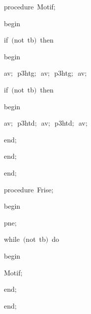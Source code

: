 {\pagebreak[3] 
\vspace{\neglskip}\mbox{\blc  \blk\idt  \mcl procedure\idt \ Motif$;$}\par 
\vspace{\neglskip}\mbox{\blc  \blk\idt  \mcl begin\idt }\par 
\pagebreak[3] 
\vspace{\neglskip}\mbox{\blc  \blk\blk\idt  \mcl if\idt \ $($\mcl not\idt \ tb$)$\ \mcl then\idt }\par 
\vspace{\neglskip}\mbox{\blc  \blk\blk\blk\idt  \mcl begin\idt }\par 
\vspace{\neglskip}\mbox{\blc  \blk\blk\blk\blk\idt  av$;$\ p3htg$;$\ av$;$\ p3htg$;$\ av$;$\ }\par 
\pagebreak[3] 
\vspace{\neglskip}\mbox{\blc  \blk\blk\blk\blk\idt  \mcl if\idt \ $($\mcl not\idt \ tb$)$\ \mcl then\idt }\par 
\vspace{\neglskip}\mbox{\blc  \blk\blk\blk\blk\blk\idt  \mcl begin\idt }\par 
\vspace{\neglskip}\mbox{\blc  \blk\blk\blk\blk\blk\blk\idt  av$;$\ p3htd$;$\ av$;$\ p3htd$;$\ av$;$\ }\par 
\vspace{\neglskip}\mbox{\blc  \blk\blk\blk\blk\blk\idt  \mcl end\idt $;$}\par 
\vspace{\neglskip}\mbox{\blc  \blk\blk\blk\idt  \mcl end\idt $;$}\par 
\vspace{\neglskip}\mbox{\blc  \blk\idt  \mcl end\idt $;$}\par 
\medskip

\pagebreak[3] 
\vspace{\neglskip}\mbox{\blc  \blk\idt  \mcl procedure\idt \ Frise$;$}\par 
\vspace{\neglskip}\mbox{\blc  \blk\idt  \mcl begin\idt \ }\par 
\vspace{\neglskip}\mbox{\blc  \blk\blk\idt  pne$;$\ }\par 
\pagebreak[3] 
\vspace{\neglskip}\mbox{\blc  \blk\blk\idt  \mcl while\idt \ $($\mcl not\idt \ tb$)$\ \mcl do\idt }\par 
\vspace{\neglskip}\mbox{\blc  \blk\blk\blk\idt  \mcl begin\idt }\par 
\vspace{\neglskip}\mbox{\blc  \blk\blk\blk\blk\idt  Motif$;$}\par 
\vspace{\neglskip}\mbox{\blc  \blk\blk\blk\idt  \mcl end\idt $;$}\par 
\vspace{\neglskip}\mbox{\blc  \blk\idt  \mcl end\idt $;$}\par 
\medskip

}
